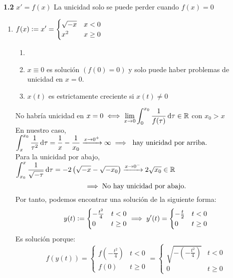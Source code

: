 \textbf{1.2} $x'=f(x)$ La unicidad solo se puede perder cuando $f(x)=0$
\begin{enumerate}
	\item $\displaystyle f(x)\vcentcolon= x'=\begin{cases}
			      \sqrt{-x} & x<0     \\
			      x^2       & x\geq 0
		      \end{cases}$
	      \begin{obs}\begin{enumerate}
			      \item[]
			      \item $x\equiv 0$ es solución $\left(f(0)=0\right)$ y solo puede haber problemas de unicidad en $x=0$.
			      \item $x(t)$ es estrictamente creciente si $x(t)\ne 0$
		      \end{enumerate}\end{obs}
	      No habría unicidad en $\ds x=0 \iff \lim_{x\to 0} \int_{0}^{x_0} \frac{1}{f(\tau)} \odif{\tau} \in \R$ con $x_0>x$ \\
	      En nuestro caso, $\ds \int_{x}^{x_0} \frac{1}{\tau^2} \odif{\tau} = \frac{1}{x} - \frac{1}{x_0} \xrightarrow{x\to 0^+} \infty \implies \tex{ hay unicidad por arriba.}$ \\
	      Para la unicidad por abajo, $\ds \int_{x_0}^{x} \frac{1}{\sqrt{-\tau}} \odif{\tau} = -2\left(\sqrt{-x} - \sqrt{-x_0}\right) \xrightarrow{x\to 0^-} 2 \sqrt{x_0} \in \R$
	      \[\implies \text{No hay unicidad por abajo.}\]
	      Por tanto, podemos encontrar una solución de la siguiente forma:
	      \[y(t)\vcentcolon= \begin{cases}
			      -\frac{t^2}{4} & t<0     \\
			      0              & t\geq 0
		      \end{cases} \implies y'(t)=\begin{cases}
			      -\frac{t}{2} & t<0     \\
			      0            & t\geq 0
		      \end{cases}\]
	      Es solución porque:
	      \[f(y(t))=\begin{cases}
			      f(-\frac{t^2}{4}) & t<0     \\
			      f(0)              & t\geq 0
		      \end{cases} = \begin{cases}
			      \sqrt{-\left(-\frac{t^2}{4}\right)} & t<0     \\
			      0                                   & t\geq 0

\end{cases}\]
\end{enumerate}
